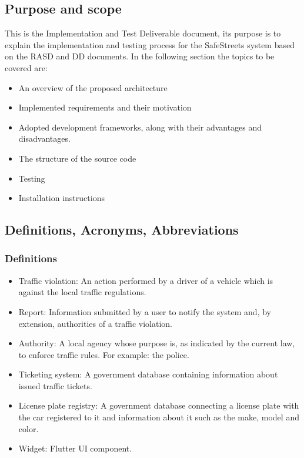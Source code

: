 \subsection{Purpose and scope}

This is the Implementation and Test Deliverable document, its purpose is to explain the implementation and testing process for the SafeStreets system based on the RASD and DD documents.
In the following section the topics to be covered are:

\begin{itemize}
    \item 
    An overview of the proposed architecture
    \item 
    Implemented requirements and their motivation
    \item 
    Adopted development frameworks, along with their advantages and disadvantages.
    \item 
    The structure of the source code
    \item 
    Testing
    \item 
    Installation instructions
\end{itemize}

\subsection{Definitions, Acronyms, Abbreviations}

\subsubsection{Definitions}
\begin{itemize}
    \item Traffic violation: An action performed by a driver of a vehicle which is against the local traffic regulations.
    \item Report: Information submitted by a user to notify the system and, by extension, authorities of a traffic violation.
    \item Authority: A local agency whose purpose is, as indicated by the current law, to enforce traffic rules. For example: the police.
    \item Ticketing system: A government database containing information about issued traffic tickets.
    \item License plate registry: A government database connecting a license plate with the car registered to it and information about it such as the make, model and color.
    \item Widget: Flutter UI component.
\end{itemize}

